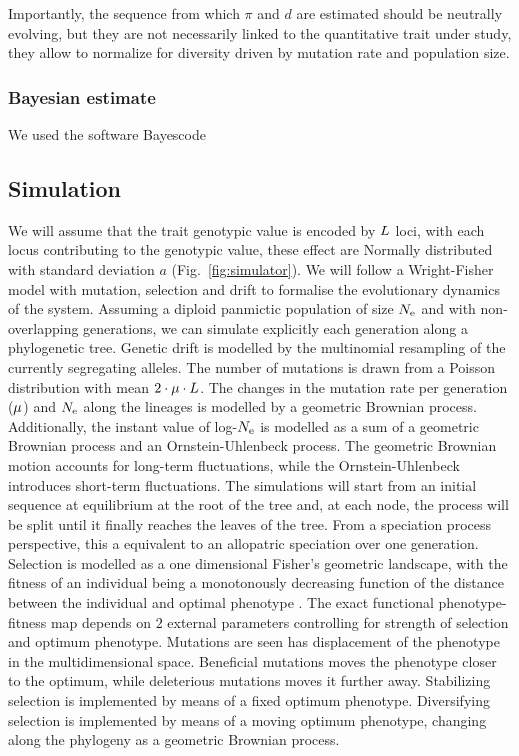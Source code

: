 \documentclass{article}
\begin{document}
Importantly, the sequence from which $\pi$ and $d$ are estimated should be neutrally evolving, but they are not necessarily linked to the quantitative trait under study, they allow to normalize for diversity driven by mutation rate and population size.

\subsubsection{Bayesian estimate}
We used the software Bayescode

\subsection{Simulation}\label{subsec:simulations}

We will assume that the trait genotypic value is encoded by $L$ loci, with each locus contributing to the genotypic value, these effect are Normally distributed with standard deviation $a$ (Fig.~\ref{fig:simulator}).
We will follow a Wright-Fisher model with mutation, selection and drift to formalise the evolutionary dynamics of the system.
Assuming a diploid panmictic population of size $N_{\text{e}}$ and with non-overlapping generations, we can simulate explicitly each generation along a phylogenetic tree.
Genetic drift is modelled by the multinomial resampling of the currently segregating alleles.
The number of mutations is drawn from a Poisson distribution with mean $2 \cdot \mu \cdot L $.
The changes in the mutation rate per generation ($\mu$) and $N_{\text{e}}$ along the lineages is modelled by a geometric Brownian process.
Additionally, the instant value of log-$N_{\text{e}}$ is modelled as a sum of a geometric Brownian process and an Ornstein-Uhlenbeck process.
The geometric Brownian motion accounts for long-term fluctuations, while the Ornstein-Uhlenbeck introduces short-term fluctuations.
The simulations will start from an initial sequence at equilibrium at the root of the tree and, at each node, the process will be split until it finally reaches the leaves of the tree.
From a speciation process perspective, this a equivalent to an allopatric speciation over one generation.
Selection is modelled as a one dimensional Fisher's geometric landscape, with the fitness of an individual being a monotonously decreasing function of the distance between the individual and optimal phenotype \cite{tenaillon_utility_2014,blanquart_epistasis_2016}.
The exact functional phenotype-fitness map depends on $2$ external parameters controlling for strength of selection and optimum phenotype.
Mutations are seen has displacement of the phenotype in the multidimensional space.
Beneficial mutations moves the phenotype closer to the optimum, while deleterious mutations moves it further away.
Stabilizing selection is implemented by means of a fixed optimum phenotype.
Diversifying selection is implemented by means of a moving optimum phenotype, changing along the phylogeny as a geometric Brownian process.
\end{document}
